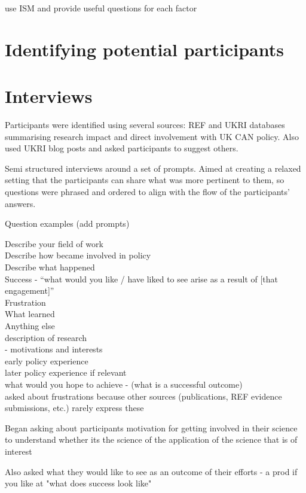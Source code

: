 \cite{MinamitaniDOI2024} use ISM and provide useful questions for each factor
\section{Identifying potential participants}\label{sec:metidentify}

\section{Interviews}\label{sec:metinterview}
Participants were identified using several sources: REF and UKRI databases summarising research impact and direct involvement with UK CAN policy. Also used UKRI blog posts and asked participants to suggest others.

Semi structured interviews around a set of prompts. Aimed at creating a relaxed setting that the participants can share what was more pertinent to them, so questions were phrased and ordered to align with the flow of the participants' answers.

Question examples (add prompts)

Describe your field of work\\
Describe how became involved in policy\\
Describe what happened\\
Success - ``what would you like / have liked to see arise as a result of [that engagement]''\\
Frustration\\
What learned\\
Anything else\\
description of research\\
 - motivations and interests\\
early policy experience\\
later policy experience if relevant\\
what would you hope to achieve - (what is a successful outcome)\\
asked about frustrations because other sources (publications, REF evidence submissions, etc.) rarely express these

Began asking about participants motivation for getting involved in their science to understand whether its the science of the application of the science that is of interest

Also asked what they would like to see as an outcome of their efforts - a prod if you like at "what does success look like"

